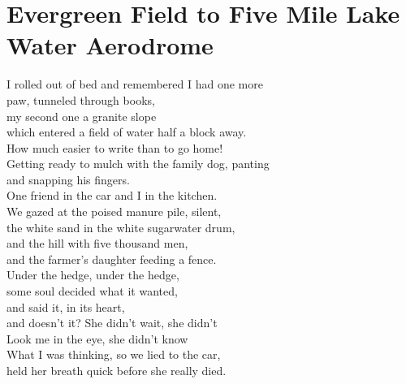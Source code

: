 \documentclass[smalldemyvopaper,11pt,twoside,onecolumn,openright,extrafontsizes]{memoir}
\begin{document}
\chapter{Evergreen Field to Five Mile Lake Water Aerodrome}
I rolled out of bed and remembered I had one more
\\paw, tunneled through books,
\\my second one a granite slope
\\which entered a field of water half a block away.
\\How much easier to write than to go home!
\\Getting ready to mulch with the family dog, panting
\\and snapping his fingers.
\\One friend in the car and I in the kitchen.
\\We gazed at the poised manure pile, silent,
\\the white sand in the white sugarwater drum,
\\and the hill with five thousand men,
\\and the farmer's daughter feeding a fence.
\\Under the hedge, under the hedge,
\\some soul decided what it wanted,
\\and said it, in its heart,
\\and doesn't it? She didn't wait, she didn't
\\Look me in the eye, she didn't know
\\What I was thinking, so we lied to the car,
\\held her breath quick before she really died.
\end{document}

